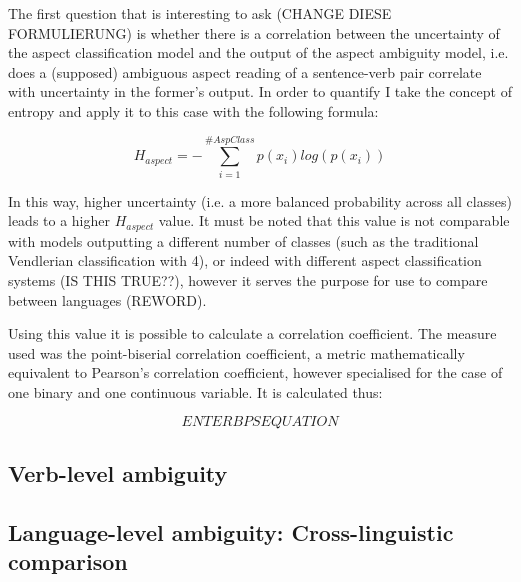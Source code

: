 The first question that is interesting to ask (CHANGE DIESE FORMULIERUNG) is whether there is a correlation between the uncertainty of the aspect classification model and the output of the aspect ambiguity model, i.e. does a (supposed) ambiguous aspect reading of a sentence-verb pair correlate with uncertainty in the former's output. In order to quantify I take the concept of entropy and apply it to this case with the following formula:

$$H_{aspect} = - \sum_{i=1}^{\#AspClass}p(x_i)log(p(x_i))$$

In this way, higher uncertainty (i.e. a more balanced probability across all classes) leads to a higher $H_{aspect}$ value. It must be noted that this value is not comparable with models outputting a different number of classes (such as the traditional Vendlerian classification with 4), or indeed with different aspect classification systems (IS THIS TRUE??), however it serves the purpose for use to compare between languages (REWORD).

Using this value it is possible to calculate a correlation coefficient. The measure used was the point-biserial correlation coefficient, a metric mathematically equivalent to Pearson's correlation coefficient, however specialised for the case of one binary and one continuous variable. It is calculated thus:

$$ENTER BPS EQUATION$$


\subsection{Verb-level ambiguity}

\subsection{Language-level ambiguity: Cross-linguistic comparison}
